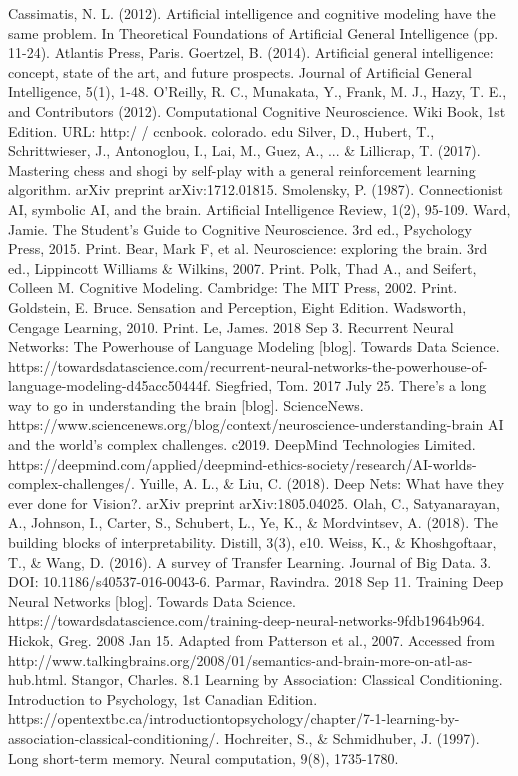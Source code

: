 \documentclass[12pt]{article}
\begin{document}
\begin{thebibliography}{50}

 Cassimatis, N. L. (2012). Artificial intelligence and cognitive modeling have the same problem. In Theoretical Foundations of Artificial General Intelligence (pp. 11-24). Atlantis Press, Paris.
 Goertzel, B. (2014). Artificial general intelligence: concept, state of the art, and future prospects. Journal of Artificial General Intelligence, 5(1), 1-48.
 O'Reilly, R. C., Munakata, Y., Frank, M. J., Hazy, T. E., and Contributors (2012). Computational Cognitive Neuroscience. Wiki Book, 1st Edition. URL: http:/ / ccnbook. colorado. edu
 Silver, D., Hubert, T., Schrittwieser, J., Antonoglou, I., Lai, M., Guez, A., ... \& Lillicrap, T. (2017). Mastering chess and shogi by self-play with a general reinforcement learning algorithm. arXiv preprint arXiv:1712.01815.
 Smolensky, P. (1987). Connectionist AI, symbolic AI, and the brain. Artificial Intelligence Review, 1(2), 95-109.
 Ward, Jamie. The Student’s Guide to Cognitive Neuroscience. 3rd ed., Psychology Press, 2015. Print.
 Bear, Mark F, et al. Neuroscience: exploring the brain. 3rd ed., Lippincott Williams \& Wilkins, 2007. Print.
 Polk, Thad A., and Seifert, Colleen M. Cognitive Modeling. Cambridge: The MIT Press, 2002. Print.
 Goldstein, E. Bruce. Sensation and Perception, Eight Edition. Wadsworth, Cengage Learning, 2010. Print.
 Le, James. 2018 Sep 3. Recurrent Neural Networks: The Powerhouse of Language Modeling [blog]. Towards Data Science. https://towardsdatascience.com/recurrent-neural-networks-the-powerhouse-of-language-modeling-d45acc50444f.
 Siegfried, Tom. 2017 July 25. There’s a long way to go in understanding the brain [blog]. ScienceNews. https://www.sciencenews.org/blog/context/neuroscience-understanding-brain
 AI and the world’s complex challenges. c2019. DeepMind Technologies Limited. https://deepmind.com/applied/deepmind-ethics-society/research/AI-worlds-complex-challenges/.
 Yuille, A. L., \& Liu, C. (2018). Deep Nets: What have they ever done for Vision?. arXiv preprint arXiv:1805.04025.
 Olah, C., Satyanarayan, A., Johnson, I., Carter, S., Schubert, L., Ye, K., \& Mordvintsev, A. (2018). The building blocks of interpretability. Distill, 3(3), e10.
 Weiss, K., \& Khoshgoftaar, T., \& Wang, D. (2016). A survey of Transfer Learning. Journal of Big Data. 3. DOI: 10.1186/s40537-016-0043-6.
 Parmar, Ravindra. 2018 Sep 11. Training Deep Neural Networks [blog]. Towards Data Science. https://towardsdatascience.com/training-deep-neural-networks-9fdb1964b964.
 Hickok, Greg. 2008 Jan 15. Adapted from Patterson et al., 2007. Accessed from http://www.talkingbrains.org/2008/01/semantics-and-brain-more-on-atl-as-hub.html.
 Stangor, Charles. 8.1 Learning by Association: Classical Conditioning. Introduction to Psychology, 1st Canadian Edition. https://opentextbc.ca/introductiontopsychology/chapter/7-1-learning-by-association-classical-conditioning/.
 Hochreiter, S., \& Schmidhuber, J. (1997). Long short-term memory. Neural computation, 9(8), 1735-1780.

\end{thebibliography}
\end{document}
